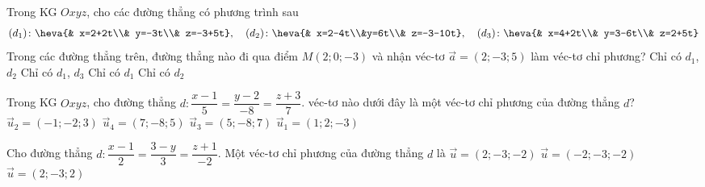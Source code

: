 	\begin{ex}%
	Trong KG $Oxyz$, cho các đường thẳng có phương trình sau 
	\begin{align*}
	(d_1)\colon\heva{& x=2+2t\\& y=-3t\\& z=-3+5t},
	\quad (d_2)\colon\heva{& x=2-4t\\&y=6t\\& z=-3-10t},
	\quad (d_3)\colon\heva{& x=4+2t\\& y=3-6t\\& z=2+5t}
	\end{align*}
	Trong các đường thẳng trên, đường thẳng nào đi qua điểm $M(2;0;-3)$ và nhận véc-tơ $\overrightarrow{a}=(2;-3;5)$ làm véc-tơ chỉ phương?
	\choice
	{\True Chỉ có $d_1$, $d_2$}
	{Chỉ có $d_1$, $d_3$}
	{Chỉ có $d_1$}
	{Chỉ có $d_2$}
	\end{ex}
	\begin{ex}%
	Trong KG $Oxyz$, cho đường thẳng $d\colon\dfrac{x-1}{5}=\dfrac{y-2}{-8}=\dfrac{z+3}{7}$. véc-tơ nào dưới đây là một véc-tơ chỉ phương của đường thẳng $d$?
	\choice
	{$\overrightarrow{u}_2=(-1;-2;3)$}
	{$\overrightarrow{u}_4=(7;-8;5)$}
	{\True $\overrightarrow{u}_3=(5;-8;7)$}
	{$\overrightarrow{u}_1=(1;2;-3)$}
	\end{ex}
	\begin{ex}%
	Cho đường thẳng $d\colon \dfrac{x-1}{2}=\dfrac{3-y}{3}=\dfrac{z+1}{-2}$. Một véc-tơ chỉ phương của đường thẳng $d$ là
	{\True $\overrightarrow{u}=(2;-3;-2)$}
	{$\overrightarrow{u}=(-2;-3;-2)$}
	{$\overrightarrow{u}=(2;-3;2)$}
	\end{ex}
